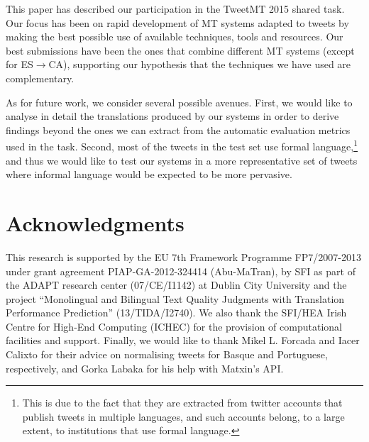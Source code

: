 \documentclass[postprint]{flammie}
\begin{document}
This paper has described our participation in the TweetMT 2015 shared task.
Our focus has been on rapid development of MT systems adapted to tweets by making the best possible use of available techniques, tools and resources.
Our best submissions have been the ones that combine different MT systems (except for ES$\rightarrow$CA), supporting our hypothesis that the techniques we have used are complementary.

As for future work, we consider several possible avenues.
First, we would like to analyse in detail the translations produced by our systems in order to derive findings beyond the ones we can extract from the automatic evaluation metrics used in the task.
Second, most of the tweets in the test set use formal language,\footnote{This is due to the fact that they are extracted from twitter accounts that publish tweets in multiple languages, and such accounts belong, to a large extent, to institutions that use formal language.} and thus we would like to test our systems in a more representative set of tweets where informal language would be expected to be more pervasive.

\section*{Acknowledgments}

This research is supported by the EU 7th Framework Programme FP7/2007-2013 under grant agreement PIAP-GA-2012-324414 (Abu-MaTran),
by SFI as part of the
ADAPT research center (07/CE/I1142) at Dublin City University and
the project ``Monolingual and Bilingual Text Quality Judgments with Translation Performance Prediction'' (13/TIDA/I2740).
We also thank the SFI/HEA Irish Centre for High-End Computing (ICHEC) for the
provision of computational facilities and support.
Finally, we would like to thank Mikel L. Forcada and Iacer Calixto for their advice on normalising tweets for Basque and Portuguese, respectively, and Gorka Labaka for his help with Matxin's API.



\end{document}
